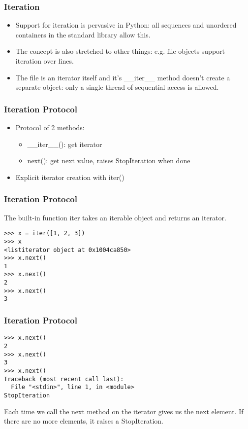 \begin{frame}[fragile]\frametitle{Iteration}
    \begin{itemize}
\item Support for iteration is pervasive in Python: all sequences and unordered containers in the standard library allow this. 
\item The concept is also stretched to other things: e.g. file objects support iteration over lines.
\item The file is an iterator itself and it's \_\_iter\_\_ method doesn't create a separate object: only a single thread of sequential access is allowed.
    \end{itemize}
\end{frame}



\begin{frame}[fragile]\frametitle{Iteration Protocol}
    \begin{itemize}
    \item Protocol of 2 methods:
    \begin{itemize}
    	\item \_\_iter\_\_(): get iterator
	\item next(): get next value, raises StopIteration when done

        \end{itemize}
        \item Explicit iterator creation with iter() 

    \end{itemize}
\end{frame}

\begin{frame}[fragile]\frametitle{Iteration Protocol}
The built-in function iter takes an iterable object and returns an iterator.
	\begin{lstlisting}
>>> x = iter([1, 2, 3])
>>> x
<listiterator object at 0x1004ca850>
>>> x.next()
1
>>> x.next()
2
>>> x.next()
3
\end{lstlisting}
\end{frame}

\begin{frame}[fragile]\frametitle{Iteration Protocol}

\begin{lstlisting}
>>> x.next()
2
>>> x.next()
3
>>> x.next()
Traceback (most recent call last):
  File "<stdin>", line 1, in <module>
StopIteration
\end{lstlisting}
Each time we call the next method on the iterator gives us the next element. If there are no more elements, it raises a StopIteration.
\end{frame}


